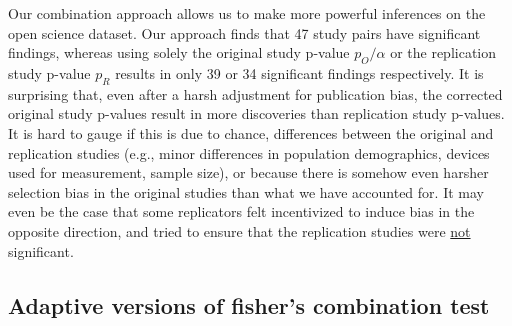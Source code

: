\documentclass{article}
\begin{document}
Our combination approach allows us to make more powerful inferences on the open science dataset. Our approach finds that 47 study pairs have significant findings, whereas using solely the original study p-value $p_O/\alpha$ or the replication study p-value $p_R$ results in only 39 or 34 significant findings respectively. It is surprising that, even after a harsh adjustment for publication bias, the corrected original study p-values result in more discoveries than replication study p-values. It is hard to gauge if this is due to chance, differences between the original and replication studies (e.g., minor differences in population demographics, devices used for measurement, sample size), or because there is somehow even harsher selection bias in the original studies than what we have accounted for. It may even be the case that some replicators felt incentivized to induce bias in the opposite direction, and tried to ensure that the replication studies were \underline{not} significant. 

\subsection{Adaptive versions of fisher's combination test}
\end{document}

